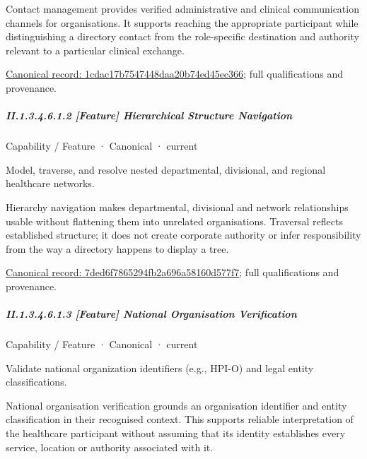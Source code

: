 Contact management provides verified administrative and clinical communication channels for organisations. It supports reaching the appropriate participant while distinguishing a directory contact from the role-specific destination and authority relevant to a particular clinical exchange.


{\footnotesize \href{../../../../continuum/strategy/capability/feature/1cdac17b7547448daa20b74ed45ec366.md}{Canonical record: 1cdac17b7547448daa20b74ed45ec366}; full qualifications and provenance.}\par
\subparagraph*{II.1.3.4.6.1.2 [Feature] Hierarchical Structure Navigation}
\label{navigation:II.1.3.4.6.1.2}

\label{element:7ded6f7865294fb2a696a58160d577f7}
{\small Capability / Feature · Canonical · current}\par

Model, traverse, and resolve nested departmental, divisional, and regional healthcare networks.



Hierarchy navigation makes departmental, divisional and network relationships usable without flattening them into unrelated organisations. Traversal reflects established structure; it does not create corporate authority or infer responsibility from the way a directory happens to display a tree.


{\footnotesize \href{../../../../continuum/strategy/capability/feature/7ded6f7865294fb2a696a58160d577f7.md}{Canonical record: 7ded6f7865294fb2a696a58160d577f7}; full qualifications and provenance.}\par
\subparagraph*{II.1.3.4.6.1.3 [Feature] National Organisation Verification}
\label{navigation:II.1.3.4.6.1.3}

\label{element:0f17fe5439fe45dc8f4edbff3cca0776}
{\small Capability / Feature · Canonical · current}\par

Validate national organization identifiers (e.g., HPI-O) and legal entity classifications.



National organisation verification grounds an organisation identifier and entity classification in their recognised context. This supports reliable interpretation of the healthcare participant without assuming that its identity establishes every service, location or authority associated with it.


